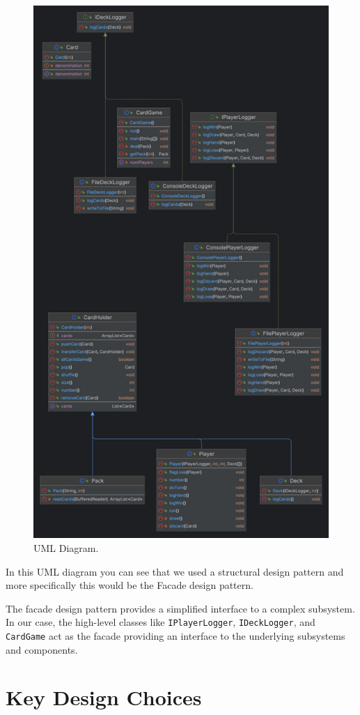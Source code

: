 \documentclass{article}
\begin{document}
    \begin{figure}[htbp]
        \centering
        \includegraphics[width=.75\textwidth]{uml}
        \caption{UML Diagram.}
        \label{fig:uml}
    \end{figure}

    In this UML diagram you can see that we used a structural design pattern and more specifically this would be the Facade design pattern.

    The facade design pattern provides a simplified interface to a complex subsystem.
    In our case, the high-level classes like \texttt{IPlayerLogger}, \texttt{IDeckLogger}, and \texttt{CardGame} act as the facade providing an interface to the underlying subsystems and components.


    \section{Key Design Choices}
\end{document}
